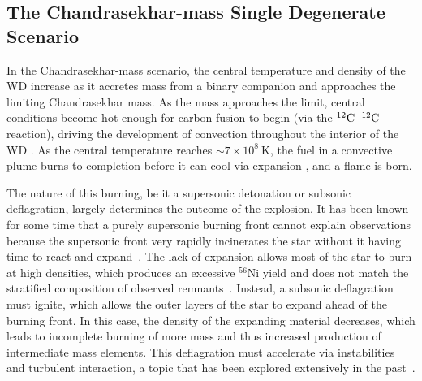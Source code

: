 \documentclass[iop,apj]{emulateapj}
\newcommand{\C}[1]{\ensuremath{{}^{#1}{\rm C}}}
\begin{document}
\subsection{The Chandrasekhar-mass Single Degenerate Scenario}


In the Chandrasekhar-mass scenario, the central temperature and 
density of the WD increase as it accretes mass from a binary companion 
and approaches the limiting Chandrasekhar mass. As the mass
approaches the limit, central conditions become hot enough for 
carbon fusion to begin (via the \C{12}--\C{12} reaction), driving 
the development of convection throughout the interior of the WD
\citep{Baraffe2004Stability-of-Su,WoosWunsKuhl04,wunschwoosley2004,Kuhletal06,nonakaetal2012}.
As the central temperature reaches $\sim 7\times 10^8~\mathrm{K}$, the
fuel in a convective plume burns to completion before it can cool via
expansion \citep{Nomo84,WoosWunsKuhl04}, and a flame is born. 

The nature of this burning, be it a supersonic detonation or subsonic 
deflagration, largely determines the outcome of the explosion. 
It has been known for some time that a purely supersonic burning front 
cannot
explain observations because the supersonic front very rapidly incinerates 
the star without it having time to react and 
expand~\citep{arnett.truran.ea:nucleosynthesis}. The lack of expansion 
allows most of the star to burn at high densities,
which produces an excessive $^{56}$Ni yield and does not match the
stratified composition of observed remnants~\citep{mazzalietal2008}.  
Instead, a subsonic deflagration must ignite, which allows the
outer layers of the star to expand ahead of the burning front.
In this case, the density of the expanding material decreases, 
which leads to incomplete burning of more mass and thus
increased production of intermediate mass elements. This
deflagration must accelerate via instabilities and turbulent
interaction, a topic that has been explored extensively in the 
past~\citep{khokhlov1993,bychovliberman1995,
SNrt,Khok95,NiemHill95,khoketal1997,ZingDurs07,
cholazarianvishniac2003,
roepkehn2003,roepkehn2004,
Zingale2005Three-dimension,Schmetal06a, Schmetal06b,Aspdetal08,
Woosetal09,csetal2009,hicksrosner2013,c-ssr2013,
jacketal2014,poludnenko2015,hicks2015}.
\end{document}
